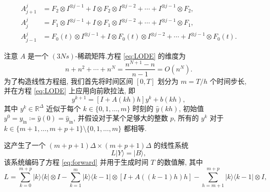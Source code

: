 \begin{method}
	\begin{align}
		A_{j+1}^j &= F_2\otimes I^{\otimes j-1}+I\otimes F_2\otimes I^{\otimes j-2}+\cdots+I^{\otimes j-1}\otimes F_2, \\
		A_j^j &= F_1\otimes I^{\otimes j-1}+I\otimes F_1\otimes I^{\otimes j-2}+\cdots+I^{\otimes j-1}\otimes F_1, \\
		A_{j-1}^j &= F_0(t)\otimes I^{\otimes j-1}+I\otimes F_0(t)\otimes I^{\otimes j-2}+\cdots+I^{\otimes j-1}\otimes F_0(t).
	\end{align}
	
	注意 $A$ 是一个 $(3Ns)$-稀疏矩阵.方程 \cref{eq:LODE} 的维度为
	$$
	n+n^2+\cdots+n^N=\frac{n^{N+1}-n}{n-1}=O(n^N).
	$$		
	为了构造线性方程组, 我们首先将时间区间 $[0,T]$ 划分为 $m = T/h$ 个时间步长, 并在方程 \cref{eq:LODE} 上应用向前欧拉法, 即
	\begin{equation}
		y^{k+1} = [I+A(kh)h] y^k + b(kh),
		\label{eq:forward}
	\end{equation}
	其中 $y^k \in \mathbb{R}^{\Delta}$ 近似于每个 $k \in \{0,1,\ldots,m\}$ 时刻的 $\hat y(kh)$, 初始值 $y^0 = y_{\mathrm{in}} \coloneqq \hat y(0) = \hat y_{\mathrm{in}}$, 并假设对于某个足够大的整数 $p$, 所有的 $y^k$ 对于 $k\in\{m+1,\ldots,m+p+1\}\setminus\{0,1,\ldots,m\}$ 都相等.
	
	这产生了一个 $(m+p+1)\Delta\times(m+p+1)\Delta$ 的线性系统
	\begin{equation}
		L|Y\rangle=|B\rangle,
		\label{eq:linear_system}
	\end{equation}
	该系统编码了方程 \cref{eq:forward} 并用于生成时间 $T$ 的数值解, 其中
	\begin{equation}
		L = \sum_{k=0}^{m+p}|k\rangle\langle k|\otimes I-\sum_{k=1}^{m}|k\rangle\langle k-1|\otimes [I+A((k-1)h)h]-\sum_{h=m+1}^{m+p}|k\rangle\langle k-1|\otimes I,
		\label{eq:matrixL}
	\end{equation}
	

\end{method}
